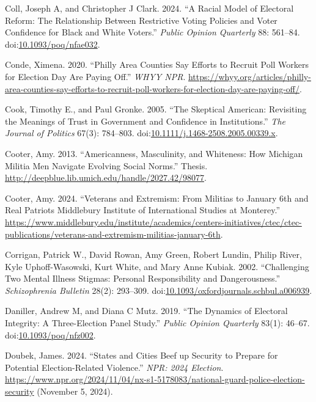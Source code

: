 \documentclass[
  12pt,
  letterpaper,
]{article}
\newlength{\cslhangindent}
\newenvironment{CSLReferences}[2] %
 {\begin{list}{}{%
  \setlength{\itemindent}{0pt}
  \setlength{\leftmargin}{0pt}
  \setlength{\parsep}{0pt}
  \ifodd #1
   \setlength{\leftmargin}{\cslhangindent}
   \setlength{\itemindent}{-1\cslhangindent}
  \fi
  \setlength{\itemsep}{#2\baselineskip}}}
 {\end{list}}
\begin{document}
\begin{CSLReferences}{1}{1}
Coll, Joseph A, and Christopher J Clark. 2024. {``A {Racial Model} of
{Electoral Reform}: {The Relationship} Between {Restrictive Voting
Policies} and {Voter Confidence} for {Black} and {White Voters}.''}
\emph{Public Opinion Quarterly} 88: 561--84.
doi:\href{https://doi.org/10.1093/poq/nfae032}{10.1093/poq/nfae032}.

Conde, Ximena. 2020. {``Philly Area Counties Say Efforts to Recruit Poll
Workers for {Election Day} Are Paying Off.''} \emph{WHYY NPR}.
\url{https://whyy.org/articles/philly-area-counties-say-efforts-to-recruit-poll-workers-for-election-day-are-paying-off/}.

Cook, Timothy E., and Paul Gronke. 2005. {``The {Skeptical American}:
{Revisiting} the {Meanings} of {Trust} in {Government} and {Confidence}
in {Institutions}.''} \emph{The Journal of Politics} 67(3): 784--803.
doi:\href{https://doi.org/10.1111/j.1468-2508.2005.00339.x}{10.1111/j.1468-2508.2005.00339.x}.

Cooter, Amy. 2013. {``Americanness, {Masculinity}, and {Whiteness}: {How
Michigan Militia Men Navigate Evolving Social Norms}.''} Thesis.
\url{http://deepblue.lib.umich.edu/handle/2027.42/98077}.

Cooter, Amy. 2024. {``Veterans and {Extremism}: {From Militias} to
{January} 6th and {Real Patriots} \textbar{} {Middlebury Institute} of
{International Studies} at {Monterey}.''}
\url{https://www.middlebury.edu/institute/academics/centers-initiatives/ctec/ctec-publications/veterans-and-extremism-militias-january-6th}.

Corrigan, Patrick W., David Rowan, Amy Green, Robert Lundin, Philip
River, Kyle Uphoff-Wasowski, Kurt White, and Mary Anne Kubiak. 2002.
{``Challenging {Two Mental Illness Stigmas}: {Personal Responsibility}
and {Dangerousness}.''} \emph{Schizophrenia Bulletin} 28(2): 293--309.
doi:\href{https://doi.org/10.1093/oxfordjournals.schbul.a006939}{10.1093/oxfordjournals.schbul.a006939}.

Daniller, Andrew M, and Diana C Mutz. 2019. {``The {Dynamics} of
{Electoral Integrity}: {A Three-Election Panel Study}.''} \emph{Public
Opinion Quarterly} 83(1): 46--67.
doi:\href{https://doi.org/10.1093/poq/nfz002}{10.1093/poq/nfz002}.

Doubek, James. 2024. {``States and Cities Beef up Security to Prepare
for Potential Election-Related Violence.''} \emph{NPR: 2024 Election}.
\url{https://www.npr.org/2024/11/04/nx-s1-5178083/national-guard-police-election-security}
(November 5, 2024).


\end{CSLReferences}
\end{document}
